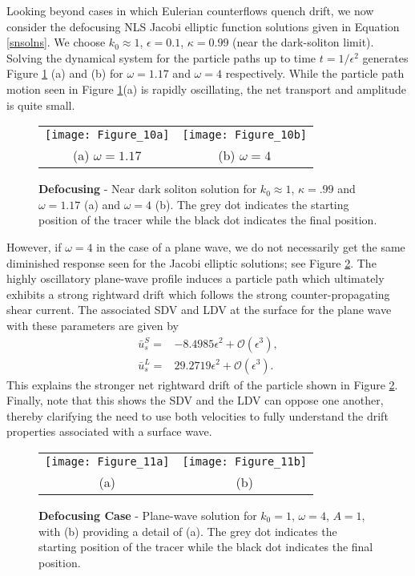 \documentclass{JFM_Style/jfm}
\begin{document}
Looking beyond cases in which Eulerian counterflows quench drift, we now consider the defocusing NLS Jacobi elliptic function solutions given in Equation \eqref{snsolns}.  We choose $k_{0}\approx1$, $\epsilon=0.1$, $\kappa=0.99$ (near the dark-soliton limit).  Solving the dynamical system for the particle paths up to time $t=1/\epsilon^{2}$ generates Figure \ref{fig:defoc_kap_pt99} (a) and (b) for $\omega= 1.17$ and $\omega= 4$ respectively.  While the particle path motion seen in Figure \ref{fig:defoc_kap_pt99}(a) is rapidly oscillating, the net transport and amplitude is quite small.
\begin{figure}
\centering
\begin{tabular}{cc}
\texttt{[image: Figure\_10a]} &\texttt{[image: Figure\_10b]} \\
(a) $\omega = 1.17$ & (b) $\omega=4$
\end{tabular}
\caption{\small {\bf Defocusing} - Near dark soliton solution for $k_{0}\approx1$, $\kappa=.99$ and $\omega=1.17$ (a) and $\omega=4$ (b).  The grey dot indicates the starting position of the tracer while the black dot indicates the final position.}
\label{fig:defoc_kap_pt99}
\end{figure}

However, if $\omega=4$ in the case of a plane wave, we do not necessarily get the same diminished response seen for the Jacobi elliptic solutions; see Figure \ref{fig:defoc_pwave}.  The highly oscillatory plane-wave profile induces a particle path which ultimately exhibits a strong rightward drift which follows the strong counter-propagating shear current.   The associated SDV and LDV at the surface for the plane wave with these parameters are given by
\begin{align*}
\bar{u}^{S}_{s} = & -8.4985\epsilon^{2} + \mathcal{O}(\epsilon^{3}),\\
\bar{u}^{L}_{s} = & 29.2719\epsilon^{2} + \mathcal{O}(\epsilon^{3}).
\end{align*}
This explains the stronger net rightward drift of the particle shown in Figure \ref{fig:defoc_pwave}.  Finally, note that this shows the SDV and the LDV can oppose one another, thereby clarifying the need to use both velocities to fully understand the drift properties associated with a surface wave.
 \begin{figure}
\centering
\begin{tabular}{cc}
\texttt{[image: Figure\_11a]} & \texttt{[image: Figure\_11b]}\\
(a) & (b)
\end{tabular}
\caption{\small {\bf Defocusing Case} - Plane-wave solution for $k_{0}=1$, $\omega=4$, $A=1$, with (b) providing a detail of (a).  The grey dot indicates the starting position of the tracer while the black dot indicates the final position.}
\label{fig:defoc_pwave}
\end{figure}
\end{document}

